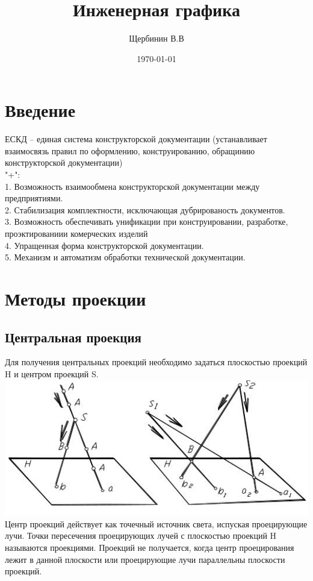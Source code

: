\documentclass[a4paper, 12pt]{article}
\title{Инженерная графика}
\author{Щербинин В.В}
\date{\today}
\begin{document}
\sffamily
\maketitle

\section*{Введение}

ЕСКД -- единая система конструкторской документации (устанавливает взаимосвязь правил по оформлению, конструированию, обращинию конструкторской документации)\\
"+":\\
1. Возможность взаимообмена конструкторской документации между предприятиями.\\
2. Стабилизация комплектности, исключающая дубрированость документов.\\
3. Возможность обеспечивать унификации при конструировании, разработке, проэктированиии комерческих изделий\\
4. Упращенная форма конструкторской документации.\\
5. Механизм и автоматизм обработки технической документации.\\
\newpage
\section{Методы проекции}

\subsection{Центральная проекция}
Для получения центральных проекций необходимо задаться плоскостью проекций H и центром проекций S.\\
\includegraphics{eng1}\\
Центр проекций действует как точечный источник света, испуская проецирующие лучи. Точки пересечения проецирующих лучей с плоскостью проекций H называются проекциями. Проекций не получается, когда центр проецирования лежит в данной плоскости или проецирующие лучи параллельны плоскости проекций.\\
\end{document}
